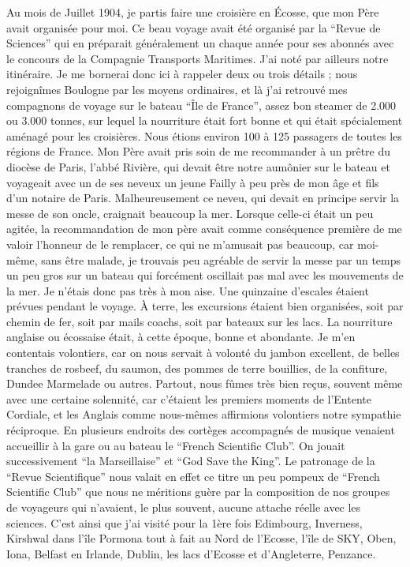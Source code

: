 \documentclass[11pt,a4paper]{report}
\begin{document}
Au mois de Juillet 1904, je partis faire une croisière en Écosse, que mon Père avait organisée pour moi. Ce beau voyage avait été organisé par la ``Revue de Sciences'' qui en préparait généralement un chaque année pour ses abonnés avec le concours de la Compagnie Transports Maritimes. J'ai noté par ailleurs notre itinéraire. Je me bornerai donc ici à rappeler deux ou trois détails ; nous rejoignîmes Boulogne par les moyens ordinaires, et là j'ai retrouvé mes compagnons de voyage sur le bateau ``Île de France'', assez bon steamer de 2.000 ou 3.000 tonnes, sur lequel la nourriture était fort bonne et qui était spécialement aménagé pour les croisières. Nous étions environ 100 à 125 passagers de toutes les régions de France. Mon Père avait pris soin de me recommander à un prêtre du diocèse de Paris, l'abbé Rivière, qui devait être notre aumônier sur le bateau et voyageait avec un de ses neveux un jeune Failly à peu près de mon âge et fils d'un notaire de Paris. Malheureusement ce neveu, qui devait en principe servir la messe de son oncle, craignait beaucoup la mer. Lorsque celle-ci était un peu agitée, la recommandation de mon père avait comme conséquence première de me valoir l'honneur de le remplacer, ce qui ne m'amusait pas beaucoup, car moi-même, sans être malade, je trouvais peu agréable de servir la messe par un temps un peu gros sur un bateau qui forcément oscillait pas mal avec les mouvements de la mer. Je n'étais donc pas très à mon aise. Une quinzaine d'escales étaient prévues pendant le voyage. À terre, les excursions étaient bien organisées, soit par chemin de fer, soit par mails coachs, soit par bateaux sur les lacs. La nourriture anglaise ou écossaise était, à cette époque, bonne et abondante. Je m'en contentais volontiers, car on nous servait à volonté du jambon excellent, de belles tranches de rosbeef, du saumon, des pommes de terre bouillies, de la confiture, Dundee Marmelade ou autres. Partout, nous fûmes très bien reçus, souvent même avec une certaine solennité, car c'étaient les premiers moments de l'Entente Cordiale, et les Anglais comme nous-mêmes affirmions volontiers notre sympathie réciproque. En plusieurs endroits des cortèges accompagnés de musique venaient accueillir à la gare ou au bateau le ``French Scientific Club''. On jouait successivement ``la Marseillaise'' et ``God Save the King''. Le patronage de la ``Revue Scientifique'' nous valait en effet ce titre un peu pompeux de ``French Scientific Club'' que nous ne méritions guère par la composition de nos groupes de voyageurs qui n'avaient, le plus souvent, aucune attache réelle avec les sciences. C'est ainsi que j'ai visité pour la 1ère fois Edimbourg, Inverness, Kirshwal dans l'île Pormona tout à fait au Nord de l'Ecosse, l'île de SKY, Oben, Iona, Belfast en Irlande, Dublin, les lacs d'Ecosse et d'Angleterre, Penzance.
\end{document}
